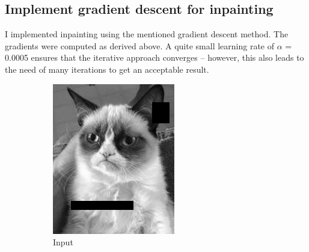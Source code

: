 \documentclass{paper}
\begin{document}
\subsection*{Implement gradient descent for inpainting}
I implemented inpainting using the mentioned gradient descent method. The gradients were computed as derived above. 
A quite small learning rate of $\alpha$ = 0.0005 ensures that the iterative approach converges -- however, this also leads to the need of many iterations to get an acceptable result.
\begin{figure}[ht]
\centering
\begin{subfigure}[h]{0.45\textwidth}
	\centering
	\includegraphics[width=\textwidth]{cat-input}
	\caption*{Input}
\end{subfigure}
~
\begin{subfigure}[h]{0.45\textwidth}
	\centering

\end{subfigure}
\end{figure}
\end{document}
